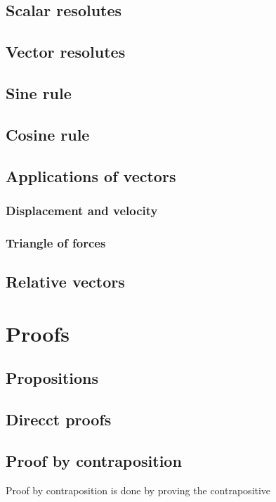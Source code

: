 \documentclass[a4paper,10pt]{report}
\begin{document}
\subsection{Scalar resolutes}

\subsection{Vector resolutes}

\subsection{Sine rule}

\subsection{Cosine rule}

\subsection{Applications of vectors}
\subsubsection{Displacement and velocity}

\subsubsection{Triangle of forces}

\subsection{Relative vectors}


\section{Proofs}
\subsection{Propositions}

\subsection{Direcct proofs}

\subsection{Proof by contraposition}
Proof by contraposition is done by proving the contrapositive
\end{document}
